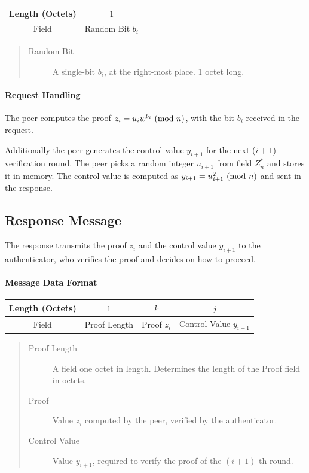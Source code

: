 \begin{center}
\begin{tabular}{|c|c|}
	\hline
	Length (Octets)  & $1$ \\
	\hline
	Field & Random Bit $b_i$\\
	\hline
\end{tabular}
\end{center}

\begin{quote}
\begin{description}
	\item[Random Bit] A single-bit $b_i$, at the right-most place. 1 octet long.
\end{description}
\end{quote}

\paragraph{Request Handling}
The peer computes the proof $z_i = u_iw^{b_i} \ (\mathrm{mod}\ n)$, with the bit $b_i$ received in the request.

Additionally the peer generates the control value $y_{i+1}$ for the next ($i+1$) verification round.
The peer picks a random integer $u_{i+1}$ from field $Z^*_n$ and stores it in memory.
The control value is computed as $y_{i+1} = u_{i+1}^2 \ (\mathrm{mod}\ n)$ and sent in the response.

\subsection*{Response Message}
The response transmits the proof $z_i$ and the control value $y_{i+1}$ to the authenticator, who verifies the proof and decides on how to proceed.

\paragraph{Message Data Format}

\begin{center}
\begin{tabular}{|c|c|c|c|}
	\hline
	Length (Octets) & $1$ & $k $ & $j$\\
	\hline
	Field & Proof Length & Proof $z_i$ & Control Value $y_{i+1}$\\
	\hline
\end{tabular}
\end{center}

\begin{quote}
\begin{description}
	\item [Proof Length] A field one octet in length. Determines the length of the Proof field in octets.
	\item [Proof] Value $z_i$ computed by the peer, verified by the authenticator.
	\item [Control Value] Value $y_{i+1}$, required to verify the proof of the $(i+1)$-th round.
\end{description}
\end{quote}

